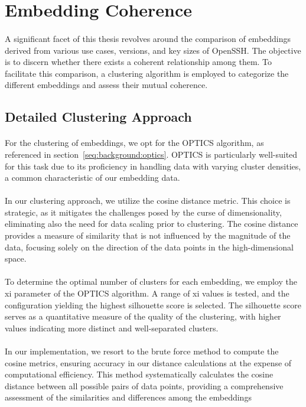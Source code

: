 \section{Embedding Coherence}\label{chap:embedding_coherence}
\paragraph{}A significant facet of this thesis revolves around the comparison of embeddings derived from various use cases, versions, and key sizes of OpenSSH. The objective is to discern whether there exists a coherent relationship among them. To facilitate this comparison, a clustering algorithm is employed to categorize the different embeddings and assess their mutual coherence.

\subsection{Detailed Clustering Approach}
    \paragraph{}For the clustering of embeddings, we opt for the OPTICS algorithm, as referenced in section~\ref{seq:background:optics}. OPTICS is particularly well-suited for this task due to its proficiency in handling data with varying cluster densities, a common characteristic of our embedding data.

    \paragraph{}In our clustering approach, we utilize the cosine distance metric. This choice is strategic, as it mitigates the challenges posed by the curse of dimensionality, eliminating also the need for data scaling prior to clustering. The cosine distance provides a measure of similarity that is not influenced by the magnitude of the data, focusing solely on the direction of the data points in the high-dimensional space.

    \paragraph{}To determine the optimal number of clusters for each embedding, we employ the xi parameter of the OPTICS algorithm. A range of xi values is tested, and the configuration yielding the highest silhouette score is selected. The silhouette score serves as a quantitative measure of the quality of the clustering, with higher values indicating more distinct and well-separated clusters.

    \paragraph{}In our implementation, we resort to the brute force method to compute the cosine metrics, ensuring accuracy in our distance calculations at the expense of computational efficiency. This method systematically calculates the cosine distance between all possible pairs of data points, providing a comprehensive assessment of the similarities and differences among the embeddings